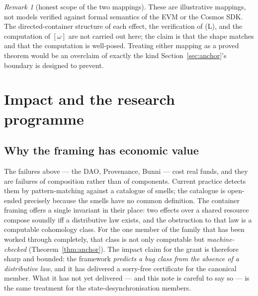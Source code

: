 \documentclass[11pt]{amsart}
\theoremstyle{definition}
\theoremstyle{remark}
\newtheorem{remark}[theorem]{Remark}
\begin{document}
\begin{remark}[honest scope of the two mappings]
These are illustrative mappings, not models verified against formal semantics of the EVM or the
Cosmos SDK. The directed-container structure of each effect, the verification of (L), and the
computation of $[\omega]$ are not carried out here; the claim is that the shape matches and that the
computation is well-posed. Treating either mapping as a proved theorem would be an overclaim of
exactly the kind Section~\ref{sec:anchor}'s boundary is designed to prevent.
\end{remark}

\section{Impact and the research programme}\label{sec:impact}

\subsection*{Why the framing has economic value}
The failures above --- the DAO, Provenance, Bunni --- cost real funds, and they are failures of
composition rather than of components. Current practice detects them by pattern-matching against a
catalogue of smells; the catalogue is open-ended precisely because the smells have no common
definition. The container framing offers a single invariant in their place: two effects over a
shared resource compose soundly iff a distributive law exists, and the obstruction to that law is a
computable cohomology class. For the one member of the family that has been worked through
completely, that class is not only computable but \emph{machine-checked}
(Theorem~\ref{thm:anchor}). The impact claim for the grant is therefore sharp and bounded: the
framework \emph{predicts a bug class from the absence of a distributive law}, and it has delivered a
sorry-free certificate for the canonical member. What it has not yet delivered --- and this note is
careful to say so --- is the same treatment for the state-desynchronisation members.
\end{document}
